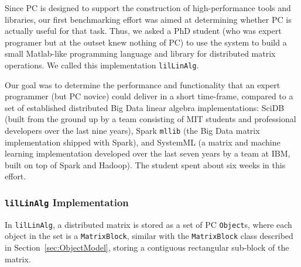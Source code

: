 Since PC is designed to support the construction
of high-performance tools and libraries, our first benchmarking effort was aimed at determining 
whether PC is actually useful for that task.  Thus, we asked
a PhD student (who was expert programer but at the outset knew nothing of PC) 
to use the system to build a small Matlab-like 
programming language and library for distributed matrix operations.
We called this implementation \texttt{lilLinAlg}.

Our goal was to determine the 
performance and functionality that an expert programmer (but PC novice) could deliver in a short
time-frame, compared to a set of established distributed Big Data linear algebra implementations:
SciDB \cite{brown2010overview, stonebraker2011architecture} (built from the ground up by a team
consisting of MIT students and professional developers over the last
nine years), Spark \texttt{mllib} \cite{meng2016mllib} 
(the Big Data matrix
implementation shipped with Spark), and SystemML \cite{boehm2014hybrid, ghoting2011systemml, boehm2016systemml}
(a matrix and machine learning implementation developed
over the last seven years by a team at IBM, built on top of Spark and Hadoop).
The student spent about six weeks in this effort.

\subsubsection{\texttt{lilLinAlg} Implementation}

In \texttt{lilLinAlg}, a distributed matrix is stored as a set of PC \texttt{Object}s, where each 
object in the set is a \texttt{MatrixBlock}, similar with the
\texttt{MatrixBlock} class described in
Section~\ref{sec:ObjectModel}, storing a contiguous rectangular sub-block of the matrix.

%
%
%
%

